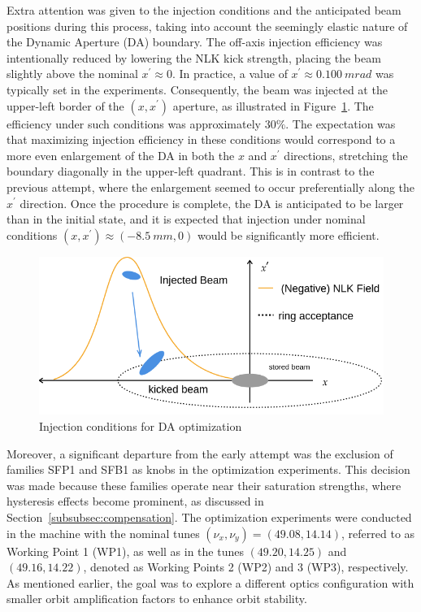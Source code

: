 Extra attention was given to the injection conditions and the anticipated beam positions during this process, taking into account the seemingly elastic nature of the Dynamic Aperture (DA) boundary. The off-axis injection efficiency was intentionally reduced by lowering the NLK kick strength, placing the beam slightly above the nominal $x^\prime\approx 0$. In practice, a value of $x^\prime\approx 0.100~\unit{mrad}$ was typically set in the experiments. Consequently, the beam was injected at the upper-left border of the $(x,x^\prime)$ aperture, as illustrated in Figure~\ref{fig:inj_cond}. The efficiency under such conditions was approximately $30\%$. The expectation was that maximizing injection efficiency in these conditions would correspond to a more even enlargement of the DA in both the $x$ and $x^{\prime}$ directions, stretching the boundary diagonally in the upper-left quadrant. This is in contrast to the previous attempt, where the enlargement seemed to occur preferentially along the $x^\prime$ direction. Once the procedure is complete, the DA is anticipated to be larger than in the initial state, and it is expected that injection under nominal conditions $(x, x^\prime)\approx(-8.5~\unit{mm}, 0)$ would be significantly more efficient.
\begin{figure}[b]
    \centering
    \includegraphics[width=0.7\columnwidth]{Images/inj_cond.png}
    \caption{Injection conditions for DA optimization}
    \label{fig:inj_cond}
\end{figure}

Moreover, a significant departure from the early attempt was the exclusion of families SFP1 and SFB1 as knobs in the optimization experiments. This decision was made because these families operate near their saturation strengths, where hysteresis effects become prominent, as discussed in Section~\ref{subsubsec:compensation}. The optimization experiments were conducted in the machine with the nominal tunes $(\nu_x,\nu_y)=(49.08, 14.14)$, referred to as Working Point 1 (WP1), as well as in the tunes $(49.20, 14.25)$ and $(49.16, 14.22)$, denoted as Working Points 2 (WP2) and 3 (WP3), respectively. As mentioned earlier, the goal was to explore a different optics configuration with smaller orbit amplification factors to enhance orbit stability.
